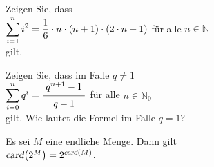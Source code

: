 \exercise
Zeigen Sie, dass
\\[0.2cm]
\hspace*{1.3cm}
$\displaystyle\sum\limits_{i=1}^{n} i^2 = \frac{1}{6} \cdot n \cdot (n+1) \cdot (2 \cdot n + 1)$ \quad
f\"{u}r alle $n \in \mathbb{N}$ 
\\[0.2cm]
gilt.  \exend

\exercise
Zeigen Sie, dass im Falle $q \not= 1$
\\[0.2cm]
\hspace*{1.3cm}
$\ds\sum\limits_{i=0}^{n} q^i = \bruch{q^{n+1} - 1}{q - 1}$ \quad
f\"{u}r alle $n \in \mathbb{N}_0$ 
\\[0.2cm]
gilt.  Wie lautet die Formel im Falle $q=1$? \exend


\begin{Satz}
Es sei $M$ eine endliche Menge.  Dann gilt
\\[0.2cm]
\hspace*{1.3cm}
$\textsl{card}\bigl(2^M\bigr) = 2^{\textsl{card}(M)}$.
\end{Satz}

